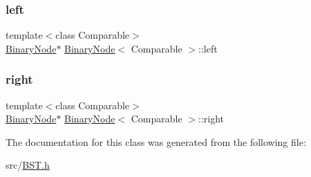 \mbox{\label{classBinaryNode_a2b6352b5519f90f2d9c2d610b2278dac}} 
\subsubsection{\texorpdfstring{left}{left}}
{\footnotesize\ttfamily template$<$class Comparable$>$ \\
\hyperlink{classBinaryNode}{Binary\+Node}$\ast$ \hyperlink{classBinaryNode}{Binary\+Node}$<$ Comparable $>$\+::left\hspace{0.3cm}{\ttfamily [private]}}

\mbox{\label{classBinaryNode_a847342c242923f34b77fc5e402fbbb4b}} 
\subsubsection{\texorpdfstring{right}{right}}
{\footnotesize\ttfamily template$<$class Comparable$>$ \\
\hyperlink{classBinaryNode}{Binary\+Node}$\ast$ \hyperlink{classBinaryNode}{Binary\+Node}$<$ Comparable $>$\+::right\hspace{0.3cm}{\ttfamily [private]}}



The documentation for this class was generated from the following file\+:\begin{DoxyCompactItemize}
\item 
src/\hyperlink{BST_8h}{B\+S\+T.\+h}\end{DoxyCompactItemize}
